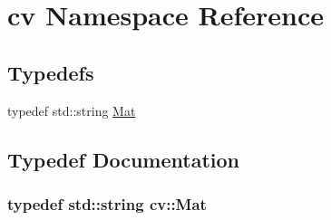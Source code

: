 \hypertarget{namespacecv}{\section{cv Namespace Reference}
\label{namespacecv}
}
\subsection*{Typedefs}
\begin{DoxyCompactItemize}
\item 
typedef std\-::string \hyperlink{namespacecv_a60d81b54f4914bec4cc4a72ab77eb444}{Mat}
\end{DoxyCompactItemize}


\subsection{Typedef Documentation}
\hypertarget{namespacecv_a60d81b54f4914bec4cc4a72ab77eb444}{
\subsubsection[{Mat}]{\setlength{\rightskip}{0pt plus 5cm}typedef std\-::string {\bf cv\-::\-Mat}}}\label{namespacecv_a60d81b54f4914bec4cc4a72ab77eb444}
